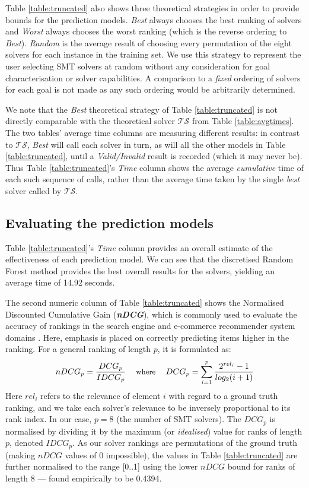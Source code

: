 \documentclass[runningheads,a4paper]{llncs}
\begin{document}
Table \ref{table:truncated} also shows three theoretical strategies in order to provide bounds for the prediction models. \textit{Best} always chooses the best ranking of solvers and \textit{Worst} always chooses the worst ranking (which is the reverse ordering to \textit{Best}). \textit{Random} is the average result of choosing every permutation of the eight solvers for each instance in the training set.  We use this strategy to represent the user selecting SMT solvers at random without any consideration for goal characterisation or solver capabilities. 
A comparison to a \textit{fixed} ordering of solvers for each goal is not made as any such ordering would be arbitrarily determined. 

We note that the \textit{Best} theoretical strategy of Table \ref{table:truncated} is not directly comparable with the theoretical solver $\mathcal{TS}$ from Table \ref{table:avgtimes}.  The two tables' average time columns are measuring different results: in contrast to $\mathcal{TS}$, \textit{Best} will call each solver in turn, as will all the other models in Table \ref{table:truncated}, until a \textit{Valid/Invalid} result is recorded (which it may never be).  Thus Table \ref{table:truncated}'s \textit{Time} column shows the average \textit{cumulative} time of each such sequence of calls, rather than the average time taken by the single \textit{best} solver called by $\mathcal{TS}$. 

\subsection{Evaluating the prediction models}

Table \ref{table:truncated}'s \textit{Time} column provides an overall estimate of the effectiveness of each prediction model.  We can see that the discretised Random Forest method provides the best overall results for the solvers, yielding an average time of 14.92 seconds.

The second numeric column of Table \ref{table:truncated} shows the 
Normalised Discounted Cumulative Gain (\textit{\textbf{nDCG}}), which is commonly used to evaluate the accuracy of rankings in the search engine and e-commerce recommender system domains \cite{NDCG}. Here, emphasis is placed on correctly predicting items higher in the ranking. For a general ranking of length $p$, it is formulated as:
\[\small
	nDCG_p = \frac{DCG_p}{IDCG_p}
    \quad\text{ where }\quad
    DCG_p = \sum_{i=1}^{p} \frac{2^{rel_i} - 1}{log_2(i+1)}
\]
Here $rel_i$ refers to the relevance of element $i$ with regard to a ground truth ranking, and we take each solver's relevance to be inversely proportional to its rank index.  In our case, $p = 8$ (the number of SMT solvers).  The $DCG_p$ is normalised by dividing it by the maximum (or \textit{idealised}) value for ranks of length $p$, denoted $IDCG_p$. As our solver rankings are permutations of the ground truth (making $nDCG$ values of 0 impossible), the values in Table \ref{table:truncated} are further normalised to the range [0..1] using the lower $nDCG$ bound for ranks of length 8 --- found empirically to be 0.4394. 
\end{document}
